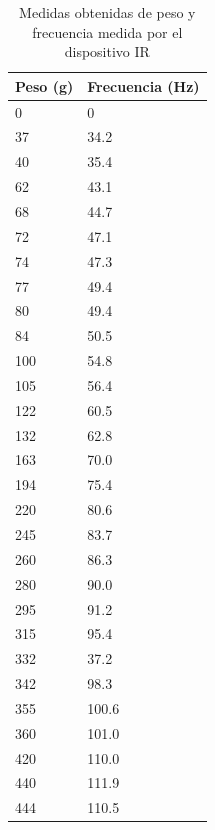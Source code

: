\documentclass[spanish,12pt,a4paper,titlepage]{report}
\begin{document}
\begin{table}[H]
\centering
\begin{tabular}{p{80pt}|p{80pt}} 
 \cellcolor[gray]{0.8} \textbf{Peso (g)} & \cellcolor[gray]{0.8} \textbf{Frecuencia (Hz)} \\ \hline
 
 0  & 0  \\ \hline
\cline{1-2}
37 & 34.2\\ \hline
\cline{1-2}
 40  & 35.4  \\ \hline
\cline{1-2}
62 & 43.1\\ \hline
\cline{1-2}
 68  & 44.7  \\ \hline
\cline{1-2}
72 & 47.1\\ \hline
\cline{1-2}
 74  & 47.3  \\ \hline
\cline{1-2}
77 & 49.4\\ \hline
\cline{1-2}
 80  & 49.4  \\ \hline
\cline{1-2}
84 & 50.5\\ \hline
\cline{1-2}
 100  & 54.8  \\ \hline
\cline{1-2}
105 & 56.4\\ \hline
\cline{1-2}
 122  & 60.5  \\ \hline
\cline{1-2}
132 & 62.8\\ \hline
\cline{1-2}
 163  & 70.0  \\ \hline
\cline{1-2}
194 & 75.4\\ \hline
\cline{1-2}
 220  & 80.6  \\ \hline
\cline{1-2}
245 & 83.7\\ \hline
\cline{1-2}
 260  & 86.3  \\ \hline
\cline{1-2}
280 & 90.0\\ \hline
\cline{1-2}
 295  & 91.2  \\ \hline
\cline{1-2}
315 & 95.4\\ \hline
\cline{1-2}
 332  & 37.2  \\ \hline
\cline{1-2}
342 & 98.3\\ \hline
\cline{1-2}
355 & 100.6\\ \hline
\cline{1-2}
360  & 101.0  \\ \hline
\cline{1-2}
420 & 110.0\\ \hline
\cline{1-2}
 440  & 111.9  \\ \hline
\cline{1-2}
444 & 110.5\\ \hline
\cline{1-2}
\end{tabular}
\caption{Medidas obtenidas de peso y frecuencia medida por el dispositivo IR}
\label{tab:fuerza-vel}
\end{table}
\end{document}

